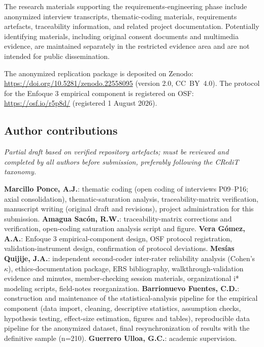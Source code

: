 \documentclass[12pt]{article}
\begin{document}
The research materials supporting the requirements-engineering phase
include anonymized interview transcripts, thematic-coding materials,
requirements artefacts, traceability information, and related project
documentation. Potentially identifying materials, including original
consent documents and multimedia evidence, are maintained separately
in the restricted evidence area and are not intended for public
dissemination.

\par
The anonymized replication package is deposited on Zenodo:
\href{https://doi.org/10.5281/zenodo.22558095}{https://doi.org/10.5281/zenodo.22558095}
(version 2.0, CC~BY~4.0). The protocol for the Enfoque 3 empirical
component is registered on OSF:
\href{https://osf.io/r5p8d/}{https://osf.io/r5p8d/} (registered
1 August 2026).


\subsection*{Author contributions}

\textit{Partial draft based on verified repository artefacts; must be
reviewed and completed by all authors before submission, preferably
following the CRediT taxonomy.}

\textbf{Marcillo Ponce, A.J.}: thematic coding (open coding of
interviews P09--P16; axial consolidation), thematic-saturation
analysis, traceability-matrix verification, manuscript writing
(original draft and revisions), project administration for this
submission.
\textbf{Amagua Sacón, R.W.}: traceability-matrix corrections and
verification, open-coding saturation analysis script and figure.
\textbf{Vera Gómez, A.A.}: Enfoque 3 empirical-component design,
OSF protocol registration, validation-instrument design, confirmation
of protocol deviations.
\textbf{Mesías Quijije, J.A.}: independent second-coder inter-rater
reliability analysis (Cohen's $\kappa$), ethics-documentation package,
ERS bibliography, walkthrough-validation evidence and minutes,
member-checking session materials, organizational i* modeling scripts,
field-notes reorganization.
\textbf{Barrionuevo Fuentes, C.D.}: construction and maintenance of the
statistical-analysis pipeline for the empirical component (data
import, cleaning, descriptive statistics, assumption checks,
hypothesis testing, effect-size estimation, figures and tables),
reproducible data pipeline for the anonymized dataset, final
resynchronization of results with the definitive sample (n=210).
\textbf{Guerrero Ulloa, G.C.}: academic supervision.
\end{document}
